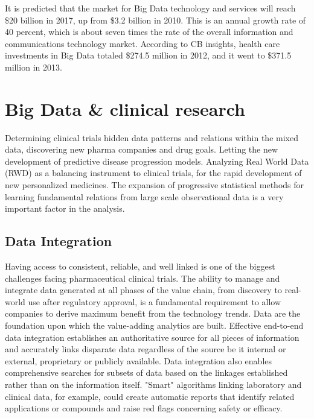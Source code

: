 \documentclass[sigconf]{acmart}
\begin{document}
It is predicted that the market for Big Data technology and services
will reach \$20 billion in 2017, up from \$3.2 billion in 2010. 
This is an annual growth rate of 40 percent, which is about seven 
times the rate of the overall information and communications 
technology market. According to CB insights, health care investments
in Big Data totaled \$274.5 million in 2012, and it went to \$371.5 
million in 2013. \cite{TR03}

\section{Big Data \& clinical research}
Determining clinical trials hidden data patterns and relations within
the mixed data, discovering new pharma companies and drug goals.
Letting the new development of predictive disease progression models.
Analyzing Real World Data (RWD) as a balancing instrument to 
clinical trials, for the rapid development of new personalized 
medicines. The expansion of progressive statistical methods for 
learning fundamental relations from large scale observational data is a
very important factor in the analysis. \cite{TR04}

\subsection{Data Integration}
Having access to consistent, reliable, and well linked is one 
of the biggest challenges facing pharmaceutical clinical trials. The
ability to manage and integrate data generated at all phases of the
value chain, from discovery to real-world use after regulatory 
approval, is a fundamental requirement to allow companies to derive
maximum benefit from the technology trends. Data are the foundation
upon which the value-adding analytics are built. Effective end-to-end
data integration establishes an authoritative source for all pieces of
information and accurately links disparate data regardless of the 
source be it internal or external, proprietary or publicly available.
Data integration also enables comprehensive searches for subsets of
data based on the linkages established rather than on the information
itself. "Smart" algorithms linking laboratory and clinical data, for
example, could create automatic reports that identify related 
applications or compounds and raise red flags concerning safety or 
efficacy. \cite{TR02}
\end{document}

